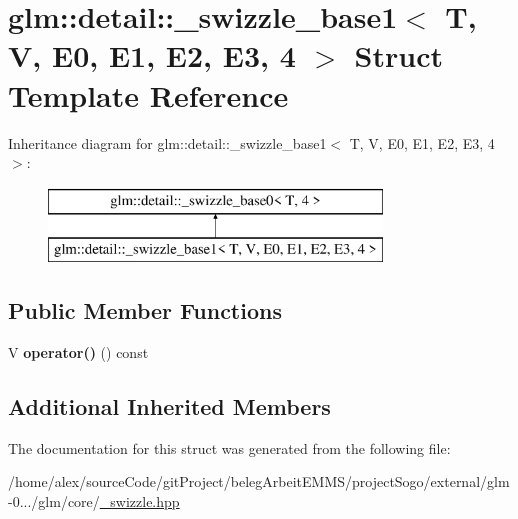 \hypertarget{structglm_1_1detail_1_1__swizzle__base1_3_01T_00_01V_00_01E0_00_01E1_00_01E2_00_01E3_00_014_01_4}{\section{glm\-:\-:detail\-:\-:\-\_\-swizzle\-\_\-base1$<$ T, V, E0, E1, E2, E3, 4 $>$ Struct Template Reference}
\label{structglm_1_1detail_1_1__swizzle__base1_3_01T_00_01V_00_01E0_00_01E1_00_01E2_00_01E3_00_014_01_4}
}
Inheritance diagram for glm\-:\-:detail\-:\-:\-\_\-swizzle\-\_\-base1$<$ T, V, E0, E1, E2, E3, 4 $>$\-:\begin{figure}[H]
\begin{center}
\leavevmode
\includegraphics[height=2.000000cm]{structglm_1_1detail_1_1__swizzle__base1_3_01T_00_01V_00_01E0_00_01E1_00_01E2_00_01E3_00_014_01_4}
\end{center}
\end{figure}
\subsection*{Public Member Functions}
\begin{DoxyCompactItemize}
\item 
\hypertarget{structglm_1_1detail_1_1__swizzle__base1_3_01T_00_01V_00_01E0_00_01E1_00_01E2_00_01E3_00_014_01_4_acca1ce42f230b5adba6b01b77af5f61a}{V {\bfseries operator()} () const }\label{structglm_1_1detail_1_1__swizzle__base1_3_01T_00_01V_00_01E0_00_01E1_00_01E2_00_01E3_00_014_01_4_acca1ce42f230b5adba6b01b77af5f61a}

\end{DoxyCompactItemize}
\subsection*{Additional Inherited Members}


The documentation for this struct was generated from the following file\-:\begin{DoxyCompactItemize}
\item 
/home/alex/source\-Code/git\-Project/beleg\-Arbeit\-E\-M\-M\-S/project\-Sogo/external/glm-\/0.../glm/core/\hyperlink{__swizzle_8hpp}{\-\_\-swizzle.\-hpp}\end{DoxyCompactItemize}
